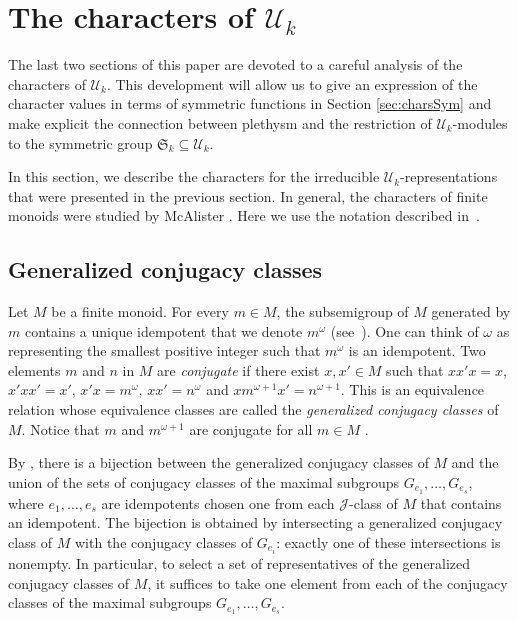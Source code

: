 \documentclass[ALCO,Unicode]{cedram}
\newcommand{\defncolor}{\color{darkred}}
\newcommand{\defn}[1]{{\defncolor\emph{#1}}} %
\begin{document}
\section{The characters of $\mathcal{U}_k$}
\label{section.characters}
The last two sections of this paper are devoted to a careful analysis of the
characters of $\mathcal{U}_k$.  This development will allow
us to give an expression of the character values in terms of symmetric
functions in Section \ref{sec:charsSym} and make explicit the connection between
plethysm and the restriction of $\mathcal{U}_k$-modules to the symmetric
group $\mathfrak{S}_k \subseteq \mathcal{U}_k$.

In this section, we describe the characters for the irreducible
$\mathcal{U}_k$-representations that were presented in the previous section.
In general, the characters of finite monoids were studied by McAlister \cite{McAlister}.
Here we use the notation described in~\cite[Chapter 7]{Steinberg.2016}.

\subsection{Generalized conjugacy classes}
Let $M$ be a finite monoid. For every $m \in M$, the subsemigroup of $M$ generated
by $m$ contains a unique idempotent that we denote \defn{$m^\omega$} (see~\cite[Corollary 1.2]{Steinberg.2016}). One
can think of $\omega$ as representing the smallest positive integer such that $m^\omega$ is an idempotent.
Two elements $m$ and $n$ in $M$ are \defn{conjugate} if there exist $x, x' \in M$ such that
$xx'x = x$, $x'xx' = x'$, $x'x = m^{\omega}$,
$xx' = n^{\omega}$ and $x m^{\omega +1}x' = n^{\omega +1}$.
This is an equivalence relation whose equivalence classes are called the
\defn{generalized conjugacy classes} of $M$.
Notice that $m$ and $m^{\omega + 1}$ are conjugate for all $m\in M$
\cite[Chapter 7]{Steinberg.2016}.

By \cite[Proposition~7.4]{Steinberg.2016},
there is a bijection between the generalized conjugacy classes of $M$
and the union of the sets of conjugacy classes of the maximal subgroups
$G_{e_1}, \ldots, G_{e_s}$, where $e_1, \ldots, e_s$ are idempotents chosen
one from each $\mathscr{J}$-class of $M$ that contains an idempotent.
The bijection is obtained by intersecting a generalized conjugacy
class of $M$ with the conjugacy classes of $G_{e_i}$: exactly one of these
intersections is nonempty.
In particular, to select a set of representatives of the generalized conjugacy
classes of $M$, it suffices to take one element from each of the conjugacy
classes of the maximal subgroups $G_{e_1}, \ldots, G_{e_s}$.
\end{document}
